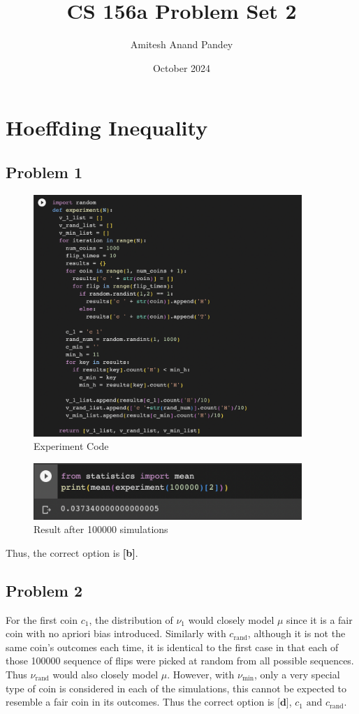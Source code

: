 \documentclass{article}
\title{CS 156a Problem Set 2}
\author{Amitesh Anand Pandey}
\date{October 2024}
\begin{document}
\maketitle
\section*{Hoeffding Inequality}
\subsection*{Problem 1}
\begin{figure}[htp]
    \centering
    \includegraphics[width=4in]{Screen Shot 2023-07-04 at 8.19.46 PM.png}
    \caption{Experiment Code}
    \label{fig:galaxy}
\end{figure}
\begin{figure}[htp]
    \centering
    \includegraphics[width=4in]{Screen Shot 2023-07-04 at 8.19.33 PM.png}
    \caption{Result after 100000 simulations}
    \label{fig:galaxy}
\end{figure}
Thus, the correct option is \textbf{[b]}.
\newpage
\subsection*{Problem 2}
For the first coin $c_{1}$, the distribution of $\nu_{1}$ would closely model $\mu$ since it is a fair coin with no apriori bias introduced. Similarly with $c_{\text{rand}}$, although it is not the same coin's outcomes each time, it is identical to the first case in that each of those 100000 sequence of flips were picked at random from all possible sequences. Thus $\nu_{\text{rand}}$ would also closely model $\mu$. However, with $\nu_{\text{min}}$, only a very special type of coin is considered in each of the simulations, this cannot be expected to resemble a fair coin in its outcomes. Thus the correct option is $\textbf{[d]}$, $c_{1} \text{ and }c_{\text{rand}}$. 
\end{document}
